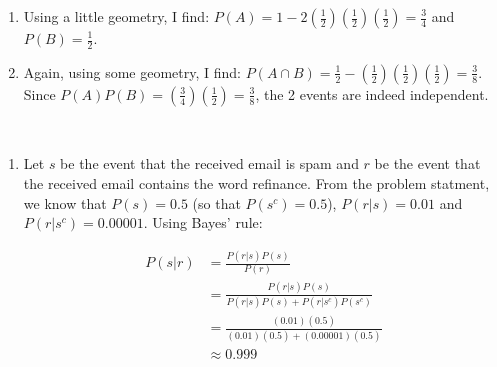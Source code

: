 \begin{problem}{30}
\begin{enumerate}
\item Using a little geometry, I find: $P(A) = 1- 2\left (\frac{1}{2} \right)\left (\frac{1}{2} \right)\left (\frac{1}{2} \right) = \frac{3}{4}$ and $P(B)=\frac{1}{2}$.

\item Again, using some geometry, I find: $P(A\cap B) = \frac{1}{2} - \left (\frac{1}{2} \right)\left (\frac{1}{2} \right)\left (\frac{1}{2} \right) = \frac{3}{8}$.  Since $P(A)P(B) =  \left (\frac{3}{4} \right) \left (\frac{1}{2} \right) =\frac{3}{8}$, the 2 events are indeed independent.

\end{enumerate}

\end{problem}


\begin{problem}{31} $ $
\begin{enumerate}
\item  Let $s$ be the event that the received email is spam and $r$ be the event that the received email contains the word refinance.  From the problem statment, we know that $P(s) = 0.5$ (so that $P(s^c) = 0.5$), $P(r|s)=0.01$ and $P(r|s^c)= 0.00001$.  Using Bayes' rule:

\begin{align*}
P(s|r) &= \frac{P(r|s)P(s)}{P(r)} \\
&= \frac{P(r|s)P(s)}{P(r|s)P(s)+P(r|s^c)P(s^c)} \\
& = \frac{(0.01) (0.5)}{(0.01)(0.5)+(0.00001)(0.5)} \\
& \approx 0.999
\end{align*}

\end{enumerate}

\end{problem}

